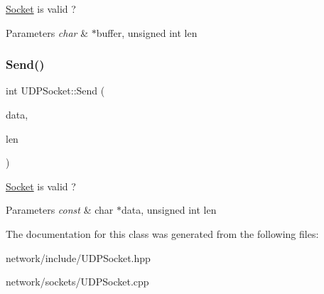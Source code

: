 \hyperlink{class_socket}{Socket} is valid ? 


\begin{DoxyParams}{Parameters}
{\em char} & $\ast$buffer, unsigned int len \\
\hline
\end{DoxyParams}
\mbox{\label{class_u_d_p_socket_a7de55d21adc2c0ad135c28eeac4edde9}} 
\subsubsection{\texorpdfstring{Send()}{Send()}}
{\footnotesize\ttfamily int U\+D\+P\+Socket\+::\+Send (\begin{DoxyParamCaption}\item[{const char $\ast$}]{data,  }\item[{unsigned int}]{len }\end{DoxyParamCaption})}



\hyperlink{class_socket}{Socket} is valid ? 


\begin{DoxyParams}{Parameters}
{\em const} & char $\ast$data, unsigned int len \\
\hline
\end{DoxyParams}


The documentation for this class was generated from the following files\+:\begin{DoxyCompactItemize}
\item 
network/include/U\+D\+P\+Socket.\+hpp\item 
network/sockets/U\+D\+P\+Socket.\+cpp\end{DoxyCompactItemize}
